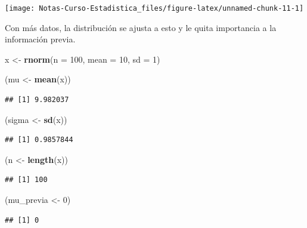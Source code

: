 \documentclass[
  12pt,
]{book}
\newenvironment{Shaded}{\begin{snugshade}}{\end{snugshade}}
\newcommand{\DataTypeTok}[1]{\textcolor[rgb]{0.13,0.29,0.53}{#1}}
\newcommand{\DecValTok}[1]{\textcolor[rgb]{0.00,0.00,0.81}{#1}}
\newcommand{\KeywordTok}[1]{\textcolor[rgb]{0.13,0.29,0.53}{\textbf{#1}}}
\newcommand{\NormalTok}[1]{#1}
\newcommand{\StringTok}[1]{\textcolor[rgb]{0.31,0.60,0.02}{#1}}
\begin{document}
\begin{center}\texttt{[image: Notas-Curso-Estadistica\_files/figure-latex/unnamed-chunk-11-1]} \end{center}

Con más datos, la distribución se ajusta a esto y le quita importancia a la información previa.

\begin{Shaded}
\begin{Highlighting}[]
\NormalTok{x \textless{}{-}}\StringTok{ }\KeywordTok{rnorm}\NormalTok{(}\DataTypeTok{n =} \DecValTok{100}\NormalTok{, }\DataTypeTok{mean =} \DecValTok{10}\NormalTok{, }\DataTypeTok{sd =} \DecValTok{1}\NormalTok{)}

\NormalTok{(mu \textless{}{-}}\StringTok{ }\KeywordTok{mean}\NormalTok{(x))}
\end{Highlighting}
\end{Shaded}

\begin{verbatim}
## [1] 9.982037
\end{verbatim}

\begin{Shaded}
\begin{Highlighting}[]
\NormalTok{(sigma \textless{}{-}}\StringTok{ }\KeywordTok{sd}\NormalTok{(x))}
\end{Highlighting}
\end{Shaded}

\begin{verbatim}
## [1] 0.9857844
\end{verbatim}

\begin{Shaded}
\begin{Highlighting}[]
\NormalTok{(n \textless{}{-}}\StringTok{ }\KeywordTok{length}\NormalTok{(x))}
\end{Highlighting}
\end{Shaded}

\begin{verbatim}
## [1] 100
\end{verbatim}

\begin{Shaded}
\begin{Highlighting}[]
\NormalTok{(mu\_previa \textless{}{-}}\StringTok{ }\DecValTok{0}\NormalTok{)}
\end{Highlighting}
\end{Shaded}

\begin{verbatim}
## [1] 0
\end{verbatim}
\end{document}
